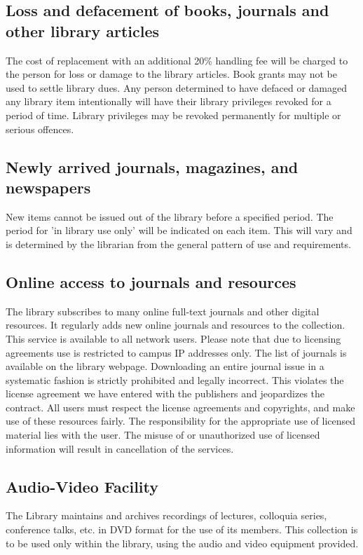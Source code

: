 \documentclass[a4paper]{extarticle}
\begin{document}
\subsection{Loss and defacement of books, journals and other library articles}
The cost of
replacement with an additional 20\% handling fee will be charged to the person for loss or
damage to the library articles. Book grants may not be used to settle library dues. Any
person determined to have defaced or damaged any library item intentionally will have their
library privileges revoked for a period of time. Library privileges may be revoked
permanently for multiple or serious offences.

\subsection{ Newly arrived journals, magazines, and newspapers}
New items cannot be issued out of
the library before a specified period. The period for 'in library use only' will be indicated on
each item. This will vary and is determined by the librarian from the general pattern of use
and requirements.

\subsection{Online access to journals and resources}
The library subscribes to many online full-text
journals and other digital resources. It regularly adds new online journals and resources to
the collection. This service is available to all network users. Please note that due to licensing
agreements use is restricted to campus IP addresses only. The list of journals is available on
the library webpage. Downloading an entire journal issue in a systematic fashion is strictly
prohibited and legally incorrect. This violates the license agreement we have entered with
the publishers and jeopardizes the contract. All users must respect the license agreements
and copyrights, and make use of these resources fairly. The responsibility for the appropriate
use of licensed material lies with the user. The misuse of or unauthorized use of licensed
information will result in cancellation of the services.

\subsection{Audio-Video Facility}
The Library maintains and archives recordings of lectures, colloquia
series, conference talks, etc. in DVD format for the use of its members. This collection is to
be used only within the library, using the audio and video equipment provided.
\end{document}
